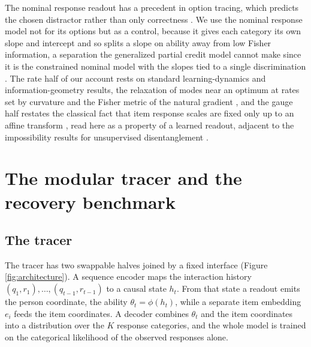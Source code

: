 \documentclass[sigconf,nonacm,screen]{acmart}
\begin{document}
The nominal response readout has a precedent in option tracing, which predicts the
chosen distractor rather than only correctness \cite{ghosh_option_2021}. We use the
nominal response model \cite{bock_estimating_1972} not for its options but as a
control, because it gives each category its own slope and intercept and so splits a
slope on ability away from low Fisher information, a separation the generalized
partial credit model cannot make since it is the constrained nominal model with the
slopes tied to a single discrimination \cite{thissen_taxonomy_1986}. The rate half
of our account rests on standard learning-dynamics and information-geometry results,
the relaxation of modes near an optimum at rates set by curvature
\cite{saxe_exact_2014} and the Fisher metric of the natural gradient
\cite{amari_natural_1998}, and the gauge half restates the classical fact that item
response scales are fixed only up to an affine transform
\cite{baker_item_2004,bock_mle_1981}, read here as a property of a learned readout,
adjacent to the impossibility results for unsupervised disentanglement
\cite{locatello_disentanglement_2019,xi_indeterminacy_2023}.

\section{The modular tracer and the recovery benchmark}
\label{sec:tracer}



\subsection{The tracer}
The tracer has two swappable halves joined by a fixed interface (Figure
\ref{fig:architecture}). A sequence encoder maps the interaction history
$(q_1,r_1),\dots,(q_{t-1},r_{t-1})$ to a causal state $h_t$. From that state a
readout emits the person coordinate, the ability $\theta_t=\phi(h_t)$, while a
separate item embedding $e_i$ feeds the item coordinates. A decoder combines
$\theta_t$ and the item coordinates into a distribution over the $K$ response
categories, and the whole model is trained on the categorical likelihood of the
observed responses alone.
\end{document}

